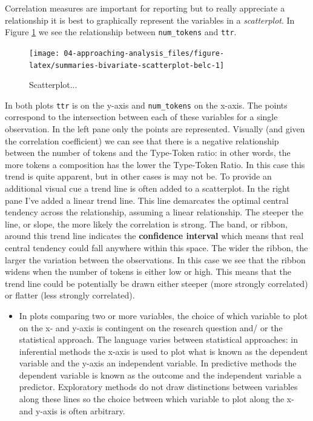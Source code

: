 \documentclass[
]{article}
\newenvironment{rmdblock}[1]
  {\begin{shaded*}
  \begin{itemize}
  \renewcommand{\labelitemi}{
    \raisebox{-.5\height}[0pt][0pt]{
      {\setkeys{Gin}{width=2em,keepaspectratio}\texttt{[image: assets/images/\#1]}}
    }
  }
  \item
  }
  {
  \end{itemize}
  \end{shaded*}
  }
\newenvironment{rmdtip}
  {\begin{rmdblock}{tip}}
  {\end{rmdblock}}
\begin{document}
Correlation measures are important for reporting but to really appreciate a relationship it is best to graphically represent the variables in a \emph{scatterplot}. In Figure \ref{fig:summaries-bivariate-scatterplot-belc} we see the relationship between \texttt{num\_tokens} and \texttt{ttr}.

\begin{figure}

{\centering \texttt{[image: 04-approaching-analysis\_files/figure-latex/summaries-bivariate-scatterplot-belc-1]} 

}

\caption{Scatterplot...}\label{fig:summaries-bivariate-scatterplot-belc}
\end{figure}

In both plots \texttt{ttr} is on the y-axis and \texttt{num\_tokens} on the x-axis. The points correspond to the intersection between each of these variables for a single observation. In the left pane only the points are represented. Visually (and given the correlation coefficient) we can see that there is a negative relationship between the number of tokens and the Type-Token ratio: in other words, the more tokens a composition has the lower the Type-Token Ratio. In this case this trend is quite apparent, but in other cases is may not be. To provide an additional visual cue a trend line is often added to a scatterplot. In the right pane I've added a linear trend line. This line demarcates the optimal central tendency across the relationship, assuming a linear relationship. The steeper the line, or slope, the more likely the correlation is strong. The band, or ribbon, around this trend line indicates the \textbf{confidence interval} which means that real central tendency could fall anywhere within this space. The wider the ribbon, the larger the variation between the observations. In this case we see that the ribbon widens when the number of tokens is either low or high. This means that the trend line could be potentially be drawn either steeper (more strongly correlated) or flatter (less strongly correlated).

\begin{rmdtip}
In plots comparing two or more variables, the choice of which variable
to plot on the x- and y-axis is contingent on the research question and/
or the statistical approach. The language varies between statistical
approaches: in inferential methods the x-axis is used to plot what is
known as the dependent variable and the y-axis an independent variable.
In predictive methods the dependent variable is known as the outcome and
the independent variable a predictor. Exploratory methods do not draw
distinctions between variables along these lines so the choice between
which variable to plot along the x- and y-axis is often arbitrary.
\end{rmdtip}
\end{document}
